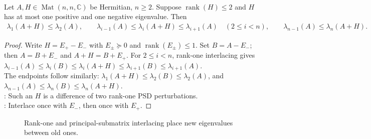 \begin{corollary} \label{cor:rank-two-one-positive-one-negative-interlacing} \\
Let $A,H\in\operatorname{Mat}(n,n,\mathbb{C})$ be Hermitian, $n\geq2$. Suppose $\operatorname{rank}(H)\leq2$ and $H$ has at most one positive and one negative eigenvalue. Then
\begin{align}
\lambda_1(A+H)\leq\lambda_2(A),\qquad
\lambda_{i-1}(A)\leq\lambda_i(A+H)\leq\lambda_{i+1}(A)\quad(2\leq i<n),
\qquad
\lambda_{n-1}(A)\leq\lambda_n(A+H).
\nonumber
\end{align}
\begin{proof}
Write $H=E_+-E_-$ with $E_\pm\succeq0$ and $\operatorname{rank}(E_\pm)\leq1$. Set $B=A-E_-$; then $A=B+E_-$ and $A+H=B+E_+$. For $2\leq i<n$, rank-one interlacing gives $\lambda_{i-1}(A)\leq\lambda_i(B)\leq\lambda_i(A+H)\leq\lambda_{i+1}(B)\leq\lambda_{i+1}(A)$.\\
The endpoints follow similarly: $\lambda_1(A+H)\leq\lambda_2(B)\leq\lambda_2(A)$, and $\lambda_{n-1}(A)\leq\lambda_n(B)\leq\lambda_n(A+H)$.\\
: Such an $H$ is a difference of two rank-one PSD perturbations.\\
: Interlace once with $E_-$, then once with $E_+$.
\end{proof}
\end{corollary}

\begin{figure}[H]
  \centering
  
  \caption{Rank-one and principal-submatrix interlacing place new eigenvalues between old ones.}
  \label{fig:eigenvalue-interlacing-ladder}
\end{figure}

